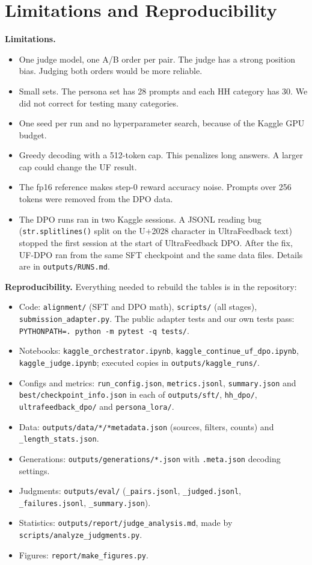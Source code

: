 \documentclass[10pt]{article}
\newcommand{\code}[1]{\texttt{\small #1}}
\begin{document}
\section{Limitations and Reproducibility}
\textbf{Limitations.}
\begin{itemize}
\item One judge model, one A/B order per pair. The judge has a strong position bias. Judging both orders would be
more reliable.
\item Small sets. The persona set has 28 prompts and each HH category has 30. We did not correct for testing many
categories.
\item One seed per run and no hyperparameter search, because of the Kaggle GPU budget.
\item Greedy decoding with a 512-token cap. This penalizes long answers. A larger cap could change the UF result.
\item The fp16 reference makes step-0 reward accuracy noise. Prompts over 256 tokens were removed from the DPO data.
\item The DPO runs ran in two Kaggle sessions. A JSONL reading bug (\code{str.splitlines()} split on the U+2028
character in UltraFeedback text) stopped the first session at the start of UltraFeedback DPO. After the fix, UF-DPO
ran from the same SFT checkpoint and the same data files. Details are in \code{outputs/RUNS.md}.
\end{itemize}

\textbf{Reproducibility.} Everything needed to rebuild the tables is in the repository:
\begin{itemize}
\item Code: \code{alignment/} (SFT and DPO math), \code{scripts/} (all stages), \code{submission\_adapter.py}. The
public adapter tests and our own tests pass: \code{PYTHONPATH=. python -m pytest -q tests/}.
\item Notebooks: \code{kaggle\_orchestrator.ipynb}, \code{kaggle\_continue\_uf\_dpo.ipynb}, \code{kaggle\_judge.ipynb};
executed copies in \code{outputs/kaggle\_runs/}.
\item Configs and metrics: \code{run\_config.json}, \code{metrics.jsonl}, \code{summary.json} and
\code{best/checkpoint\_info.json} in each of \code{outputs/sft/}, \code{hh\_dpo/}, \code{ultrafeedback\_dpo/} and
\code{persona\_lora/}.
\item Data: \code{outputs/data/*/*metadata.json} (sources, filters, counts) and \code{*\_length\_stats.json}.
\item Generations: \code{outputs/generations/*.json} with \code{.meta.json} decoding settings.
\item Judgments: \code{outputs/eval/} (\code{*\_pairs.jsonl}, \code{*\_judged.jsonl}, \code{*\_failures.jsonl},
\code{*\_summary.json}).
\item Statistics: \code{outputs/report/judge\_analysis.md}, made by \code{scripts/analyze\_judgments.py}.
\item Figures: \code{report/make\_figures.py}.
\end{itemize}
\end{document}
